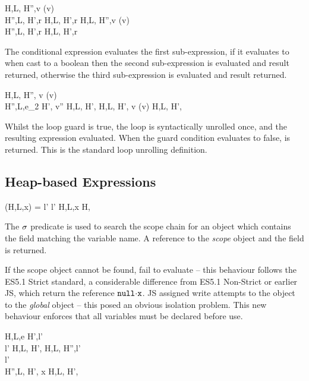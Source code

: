 \documentclass[a4paper,notitlepage]{report}
\begin{document}
  {H,L, \gevalsto H'',v \quad \istrue(v) \\
   H'',L, \evalsto H',r}
  {H,L, \evalsto H',r}
\qquad
  {H,L, \gevalsto H'',v \quad \isfalse(v) \\
   H'',L, \evalsto H',r}
  {H,L, \evalsto H',r}

  The conditional expression evaluates the first sub-expression, if it evaluates
  to  when cast to a boolean then the second
  sub-expression is evaluated and result returned, otherwise the third
  sub-expression is evaluated and result returned.

  {H,L, \gevalsto H'', v \quad \istrue(v) \\
   H'',L,e_2 \evalsto H', v''}
  {H,L, \evalsto H',\und}
\qquad
  {H,L, \gevalsto H', v \quad \isfalse(v)}
  {H,L, \evalsto H',\und}

  Whilst the loop guard is true, the loop is syntactically unrolled once, and
  the resulting expression evaluated. When the guard condition evaluates to
  false, \und is returned. This is the standard loop unrolling definition.

  \subsection{Heap-based Expressions}
  \label{sec:opsem:heapexprs}
    {\scope(H,L,x) = l' \quad l' \neq \nil}
    {H,L,\js x \evalsto H, }

  The $\sigma$ predicate is used to search the scope chain for an object which
  contains the field matching the variable name. A reference to the \emph{scope}
  object and the field is returned.

  If the scope object cannot be found, fail to evaluate -- this
  behaviour follows the ES5.1 Strict standard, a considerable difference from
  ES5.1 Non-Strict or earlier JS, which return the reference
  $\fld{\nil}{\js{x}}$.  JS assigned write attempts to the \nil object to the
  \emph{global} object -- this posed an obvious isolation problem.
  This new behaviour enforces that all variables must be declared before use.

  {H,L,\js e \gevalsto H',l' \\
   l' \neq \nil}
  {H,L, \evalsto H', }
\qquad
  {H,L, \gevalsto H'',l' \\
   l' \neq \nil \\
   H'',L, \evalsto H', x}
  {H,L, \evalsto H',}
\end{document}
